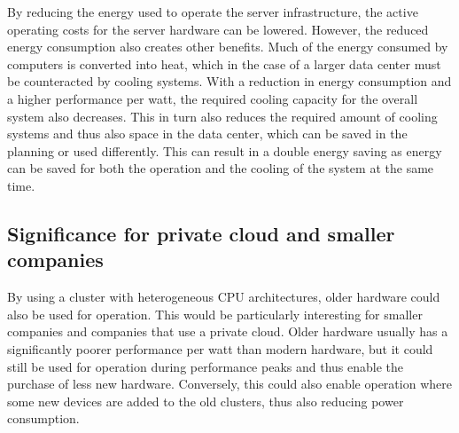 By reducing the energy used to operate the server infrastructure, the active
operating costs for the server hardware can be lowered. However, the reduced
energy consumption also creates other benefits. Much of the energy consumed by
computers is converted into heat, which in the case of a larger data center
must be counteracted by cooling systems. With a reduction in energy consumption
and a higher performance per watt, the required cooling capacity for the
overall system also decreases. This in turn also reduces the required amount of
cooling systems and thus also space in the data center, which can be saved in
the planning or used differently. This can result in a double energy saving as
energy can be saved for both the operation and the cooling of the system at the
same time.

\subsection{Significance for private cloud and smaller companies}
By using a cluster with heterogeneous CPU architectures, older hardware could
also be used for operation. This would be particularly interesting for smaller
companies and companies that use a private cloud. Older hardware usually has a
significantly poorer performance per watt than modern hardware, but it could
still be used for operation during performance peaks and thus enable the
purchase of less new hardware.  Conversely, this could also enable operation
where some new devices are added to the old clusters, thus also reducing power
consumption.
